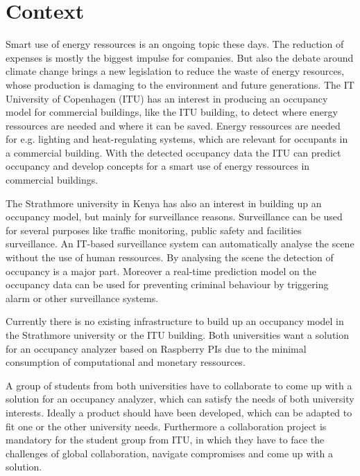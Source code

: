 \section{Context}


Smart use of energy ressources is an ongoing topic these days. The reduction of expenses is mostly the biggest impulse for companies. But also the debate around climate change brings a new legislation to reduce the waste of energy resources, whose production is damaging to the environment and future generations. The IT University of Copenhagen (ITU) has an interest in producing an occupancy model for commercial buildings, like the ITU building, to detect where energy ressources are needed and where it can be saved. Energy ressources are needed for e.g. lighting and heat-regulating systems, which are relevant for occupants in a commercial building. With the detected occupancy data the ITU can predict occupancy and develop concepts for a smart use of energy ressources in commercial buildings.

The Strathmore university in Kenya has also an interest in building up an occupancy model, but mainly for surveillance reasons. Surveillance can be used for several purposes like traffic monitoring, public safety and facilities surveillance. An IT-based surveillance system can automatically analyse the scene without the use of human ressources. By analysing the scene the detection of occupancy is a major part. Moreover a real-time prediction model on the occupancy data can be used for preventing criminal behaviour by triggering alarm or other surveillance systems.

Currently there is no existing infrastructure to build up an occupancy model in the Strathmore university or the ITU building. Both universities want a solution for an occupancy analyzer based on Raspberry PIs due to the minimal consumption of computational and monetary ressources. 

A group of students from both universities have to collaborate to come up with a solution for an occupancy analyzer, which can satisfy the needs of both university interests. Ideally a product should have been developed, which can be adapted to fit one or the other university needs.
Furthermore a collaboration project is mandatory for the student group from ITU, in which they have to face the challenges of global collaboration, navigate compromises and come up with a solution.

